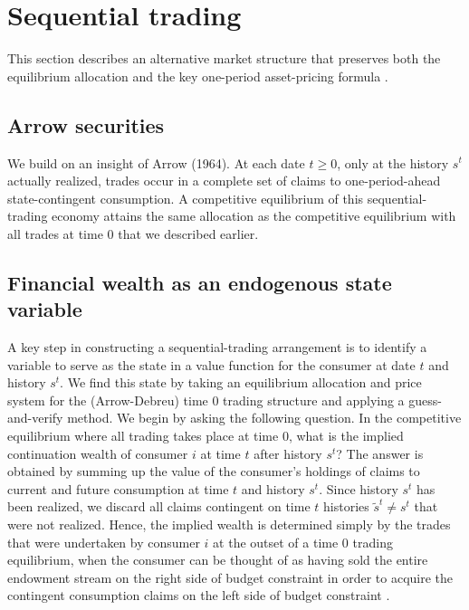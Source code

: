 
\section{Sequential trading}\label{sec:arrowsecurities}%
This section describes an alternative
market structure that preserves both the  equilibrium  allocation
 and the  key one-period asset-pricing formula
.



\subsection{Arrow securities}
We build on an insight of Arrow (1964).
At
each date  $t \geq 0$,  only at the history $s^t$ actually realized,  trades occur in a complete set of claims   to
one-period-ahead state-contingent consumption. A
competitive equilibrium of this sequential-trading economy
  attains the same allocation
as the competitive  equilibrium with all trades at time $0$ that we described earlier.



\subsection{Financial wealth as an endogenous state variable}
A key step in constructing a sequential-trading arrangement is to
identify a variable to serve as the state in a value function for
the consumer at date $t$ and history $s^t$. We find this state by taking an
equilibrium allocation and price system for the (Arrow-Debreu)
time $0$ trading structure and applying a guess-and-verify method.
We begin by asking the following question. In the competitive
equilibrium where all trading takes place at time $0$, what is the implied continuation wealth of consumer $i$ at time $t$ after history $s^t$?
The answer is obtained by summing up the value of the consumer's
holdings of claims to current and future consumption at  time $t$ and
history $s^t$. Since history $s^t$ has been realized, we discard all
claims contingent on time $t$ histories $\tilde s^t \neq s^t$ that
were not realized. Hence, the implied wealth is  determined simply
by the trades that were undertaken by consumer $i$ at the outset of a
time $0$ trading equilibrium, when the consumer can be thought of as
having sold  the entire endowment stream on the right side of budget
constraint  in order to acquire the contingent consumption claims
on the left side of budget constraint .

